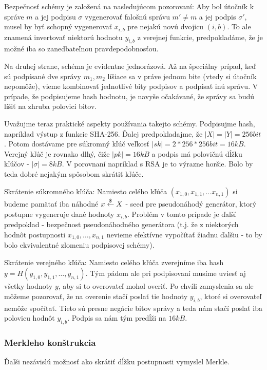 Bezpečnosť schémy je založená na nasledujúcom pozorovaní:
Aby bol útočník k správe $m$ a jej podpisu $\sigma$ vygenerovať
falošnú správu $m' \ne m$ a jej podpis $\sigma'$, musel by byť schopný
vygenerovať $x_{i,b}$ pre nejakú novú dvojicu $(i,b)$.
To ale znamená invertovať niektorú hodnotu $y_{i,b}$ z verejnej
funkcie, predpokladáme, že je možné iba so zanedbateľnou
pravdepodobnosťou.

Na druhej strane, schéma je evidentne jednorázová.
Až na špeciálny prípad, keď sú podpísané dve správy $m_1,m_2$ líšiace
sa v práve jednom bite (vtedy si útočník nepomôže), vieme kombinovať
jednotlivé bity podpisov a podpísať inú správu. V prípade, že
podpisujeme hash hodnotu, je navyše očakávané, že správy sa budú líšiť
na zhruba polovici bitov.

Uvažujme teraz praktické aspekty používania takejto schémy. Podpisujme
hash, napríklad výstup z funkcie SHA-256. Ďalej predpokladajme, že
$|X|=|Y|=256 \unit{bit}$. Potom dostávame pre súkromný kľúč veľkosť
$|sk|=2*256*256 bit =16 \unit{kB}$. Verejný kľúč je rovnako dlhý, čiže
$|pk|=16 \unit{kB}$ a podpis má polovičnú dĺžku kľúčov - $|\sigma|=8
\unit{kB}$.
V porovnaní napríklad s RSA je to výrazne horšie. Bolo by teda dobré
nejakým spôsobom skrátiť kľúče.

Skrátenie súkromného kľúča: Namiesto celého kľúča $(x_{1,0}, x_{1,1},
\ldots x_{n,1})$ si budeme pamätať iba náhodné $x \overset{\$}{\leftarrow} X$ - seed pre
pseudonáhodý generátor, ktorý postupne vygeneruje dané hodnoty
$x_{i,b}$. Problém v tomto prípade je ďalší predpoklad - bezpečnost
pseudonáhodného generátora (t.j. že z niektorých hodnôt postupnosti
$x_{1,0}, \ldots, x_{n,1}$ nevieme efektívne vypočítať žiadnu ďalšiu -
to by bolo ekvivalentné zlomeniu podpisovej schémy).

Skrátenie verejného kľúča: Namiesto celého kľúča zverejníme iba hash
$y=H(y_{1,0},y_{1,1},\ldots,y_{n,1})$. Tým pádom ale pri podpisovaní
musíme uviesť aj všetky hodnoty $y$, aby si to overovateľ mohol
overiť. Po chvíli zamyslenia sa ale môžeme pozorovať, že na overenie
stačí poslať tie hodnoty $y_{i,b}$, ktoré si overovateľ nemôže
spočítať. Tieto sú presne negácie bitov správy a teda nám stačí poslať
iba polovicu hodnôt $y_{i,b}$. Podpis sa nám tým predĺži na $16
\unit{kB}$.

\subsubsection{Merkleho konštrukcia}
Ďalši nezávislú možnosť ako skrátiť dĺžku postupnosti vymyslel
Merkle.
